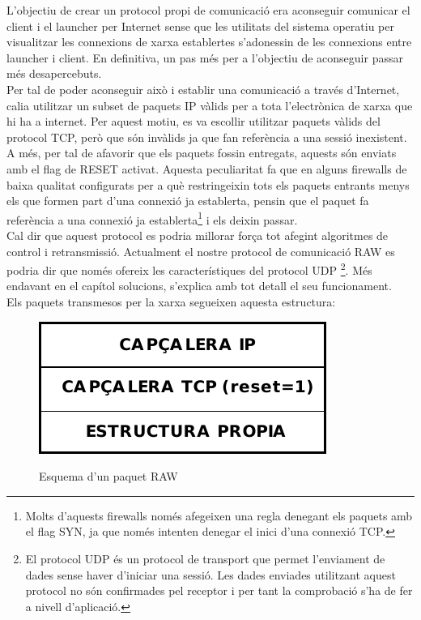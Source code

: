 L'objectiu de crear un protocol propi de comunicació era aconseguir comunicar el client i el launcher per
Internet sense que les utilitats del sistema operatiu per visualitzar les connexions de xarxa establertes
s'adonessin de les connexions entre launcher i client. En definitiva, un pas més per a l'objectiu de aconseguir 
passar més desapercebuts. \\

Per tal de poder aconseguir això i establir una comunicació a través d'Internet, calia utilitzar un subset de 
paquets IP vàlids per a tota l'electrònica de xarxa que hi ha a internet. Per aquest motiu, es va escollir
utilitzar paquets vàlids del protocol TCP, però que són invàlids ja que fan referència a una sessió inexistent.
A més, per tal de afavorir que els paquets fossin entregats, aquests són enviats amb el flag de RESET activat. 
Aquesta peculiaritat fa que en alguns firewalls de baixa qualitat configurats per a què restringeixin 
tots els paquets entrants menys els que formen part d'una connexió ja establerta, pensin que el paquet
fa referència a una connexió ja establerta\footnote{Molts d'aquests firewalls només afegeixen una regla denegant
els paquets amb el flag SYN, ja que només intenten denegar el inici d'una connexió TCP.} i els deixin passar. \\

Cal dir que aquest protocol es podria millorar força tot afegint algoritmes de control i retransmissió. Actualment
el nostre protocol de comunicació RAW es podria dir que només ofereix les característiques del protocol UDP
\footnote{El protocol UDP és un protocol de transport que permet l'enviament de dades sense haver d'iniciar una 
sessió. Les dades enviades utilitzant aquest protocol no són confirmades pel receptor i per tant la comprobació
s'ha de fer a nivell d'aplicació.}. Més endavant en el capítol solucions, s'explica amb tot detall el seu funcionament. \\

Els paquets transmesos per la xarxa segueixen aquesta estructura: \\

\begin{figure}[htp]
    \centering
    \includegraphics[scale=1,keepaspectratio]{diagrames/solutionDesignPacketStructure.pdf} \\
    \caption{Esquema d'un paquet RAW}
    \label{fig:packetScheme}
\end{figure}

